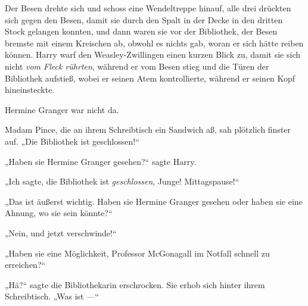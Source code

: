 Der Besen drehte sich und schoss eine Wendeltreppe hinauf, alle drei drückten sich gegen den Besen, damit sie durch den Spalt in der Decke in den dritten Stock gelangen konnten, und dann waren sie vor der Bibliothek, der Besen bremste mit einem Kreischen ab, obwohl es nichts gab, woran er sich hätte reiben können. Harry warf den Weasley-Zwillingen einen kurzen Blick zu, damit sie sich nicht \emph{vom Fleck rührten}, während er vom Besen stieg und die Türen der Bibliothek aufstieß, wobei er seinen Atem kontrollierte, während er seinen Kopf hineinsteckte.

Hermine Granger war nicht da.

Madam Pince, die an ihrem Schreibtisch ein Sandwich aß, sah plötzlich finster auf.
„Die Bibliothek ist geschlossen!“

„Haben sie Hermine Granger gesehen?“ sagte Harry.

„Ich sagte, die Bibliothek ist \emph{geschlossen}, Junge! Mittagspause!“

„Das ist äußerst wichtig. Haben sie Hermine Granger gesehen oder haben sie eine Ahnung, wo sie sein könnte?“

„Nein, und jetzt verschwinde!“

„Haben sie eine Möglichkeit, Professor McGonagall im Notfall schnell zu erreichen?“

„Hä?“ sagte die Bibliothekarin erschrocken. Sie erhob sich hinter ihrem Schreibtisch.
„Was ist —“

